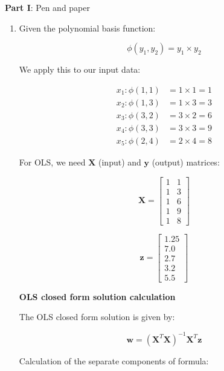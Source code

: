 \documentclass{article}
\begin{document}
\setcounter{page}{0}
\thispagestyle{empty}
\renewcommand{\thesection}{\Roman{section}}

\newpage




\large{\textbf{Part I}: Pen and paper}\normalsize

\begin{enumerate}[leftmargin=\labelsep]
\item 

Given the polynomial basis function:

\[\phi(y_1, y_2) = y_1 \times y_2\]

We apply this to our input data:

\begin{align*}
x_1: \phi(1, 1) &= 1 \times 1 = 1 \\
x_2: \phi(1, 3) &= 1 \times 3 = 3 \\
x_3: \phi(3, 2) &= 3 \times 2 = 6 \\
x_4: \phi(3, 3) &= 3 \times 3 = 9 \\
x_5: \phi(2, 4) &= 2 \times 4 = 8
\end{align*}

For OLS, we need $\mathbf{X}$ (input) and $\mathbf{y}$ (output) matrices:

\[\mathbf{X} = \begin{bmatrix}
1 & 1 \\
1 & 3 \\
1 & 6 \\
1 & 9 \\
1 & 8
\end{bmatrix}\]

\[\mathbf{z} = \begin{bmatrix}
1.25 \\
7.0 \\
2.7 \\
3.2 \\
5.5
\end{bmatrix}\]

\textbf{OLS closed form solution calculation}

The OLS closed form solution is given by:

\[\boldsymbol{w} = (\mathbf{X}^T \mathbf{X})^{-1} \mathbf{X}^T \mathbf{z}\]

Calculation of the separate components of formula:


\end{enumerate}
\end{document}
